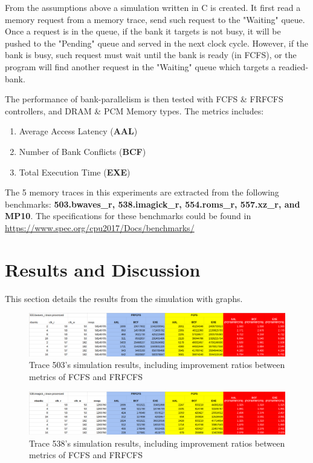 \documentclass[letterpaper, 11pt]{article}
\begin{document}
From the assumptions above a simulation written in C is created. It first read a memory request from a memory trace, send such request to the "Waiting" queue. Once a request is in the queue, if the bank it targets is not busy, it will be pushed to the "Pending" queue and served in the next clock cycle. However, if the bank is busy, such request must wait until the bank is ready (in FCFS), or the program will find another request in the "Waiting" queue which targets a readied-bank.

The performance of bank-parallelism is then tested with FCFS \& FRFCFS controllers, and DRAM \& PCM Memory types. The metrics includes:
\begin{enumerate}
	\item Average Access Latency (\textbf{AAL})
	\item Number of Bank Conflicts (\textbf{BCF})
	\item Total Execution Time (\textbf{EXE})
\end{enumerate}

The 5 memory traces in this experiments are extracted from the following benchmarks: \textbf{503.bwaves\_r, 538.imagick\_r, 554.roms\_r, 557.xz\_r, and MP10}. The specifications for these benchmarks could be found in \url{https://www.spec.org/cpu2017/Docs/benchmarks/}

\section{Results and Discussion}

This section details the results from the simulation with graphs.

\begin{figure}[htb!]
	\centering
	\includegraphics[width=1.0\linewidth]{503_results.png}
	\caption{Trace 503's simulation results, including improvement ratios between metrics of FCFS and FRFCFS}
	\label{fig1}
\end{figure}

\begin{figure}[htb!]
	\centering
	\includegraphics[width=1.0\linewidth]{538_results.png}
	\caption{Trace 538's simulation results, including improvement ratios between metrics of FCFS and FRFCFS}
	\label{fig2}
\end{figure}
\end{document}
